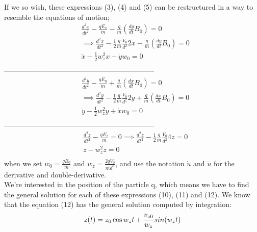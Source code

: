 \documentclass[english,notitlepage,reprint,nofootinbib,twocolumn]{article}
\begin{document}
If we so wish, these expressions (3), (4) and (5) can be restructured in a way to resemble the 
equations of motion;
\begin{equation}
    \begin{split}
        & \frac{d^2x}{dt^2} - \frac{qE_x}{m} -  \frac{q}{m}\left(\frac{dy}{dt}B_0 \right) = 0 \\
        & \implies \frac{d^2x}{dt^2} - \frac{1}{2} \frac{q}{m} \frac{V_0}{d^2}2x -  \frac{q}{m}\left(\frac{dy}{dt}B_0 \right) = 0\\                      
        & \ddot{x} - \frac{1}{2} w_z^2x -  \dot{y}w_0 = 0 \\
    \end{split}
\end{equation}
---------------------------------------------------------------
\begin{equation}
    \begin{split}
        &\frac{d^2y}{dt^2} -\frac{qE_y}{m}+\frac{q}{m}\left(\frac{dx}{dt}B_0 \right) = 0 \\
        & \implies \frac{d^2y}{dt^2} -\frac{1}{2}\frac{q}{m}\frac{V_0}{d^2}2y + \frac{q}{m}\left(\frac{dx}{dt}B_0 \right) = 0\\
        & \ddot{y} -\frac{1}{2} w_z^2y + \dot{x}w_0  = 0\\
    \end{split}
\end{equation}
---------------------------------------------------------------
\begin{equation}
    \begin{split}
        & \frac{d^2z}{dt^2} - \frac{qE_z}{m} = 0 \implies \frac{d^2z}{dt^2} -\frac{1}{2}\frac{q}{m}\frac{V_0}{d^2}4z = 0  \\
        & \ddot{z} -w_z^2 z = 0 \\
    \end{split}
\end{equation}
when we set $w_0= \frac{qB_0}{m}$  and $w_z=\frac{2qV_0}{md^2}$, and use the notation $\dot{u}$ and $\ddot{u}$ for the derivative and double-derivative. \\

We're interested in the position of the particle q, which means we have to find the general solution for each of these expressions (10), (11) and (12). We know that the equation (12) has the general solution computed by integration: 
\begin{equation}
    z(t)=z_0\cos{w_zt} + \frac{v_{z0}}{w_z}sin(w_zt) \\
\end{equation}
\end{document}
